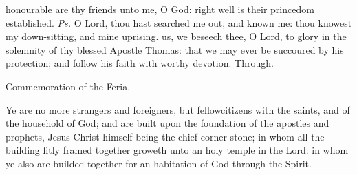 \introit
{} honourable are thy friends unto me, O God: right well is their princedom established. \textit{Ps.} O Lord, thou hast searched me out, and known me: thou knowest my down-sitting, and mine uprising.
\collect
 us, we beseech thee, O Lord, to glory in the solemnity of thy blessed Apostle Thomas: that we may ever be succoured by his protection; and follow his faith with worthy devotion. Through.

\begin{rubric}
    Commemoration of the Feria.
\end{rubric}

 Ye are no more strangers and foreigners, but fellowcitizens with the saints, and of the household of God; and are built upon the foundation of the apostles and prophets, Jesus Christ himself being the chief corner stone; in whom all the building fitly framed together groweth unto an holy temple in the Lord: in whom ye also are builded together for an habitation of God through the Spirit.


